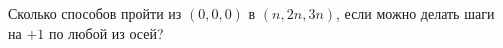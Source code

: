 \documentclass{article}
\begin{document}
Сколько способов пройти из $(0,0,0)$ в $(n,2n,3n)$, если можно делать шаги на $+1$ по любой из осей?
\end{document}
